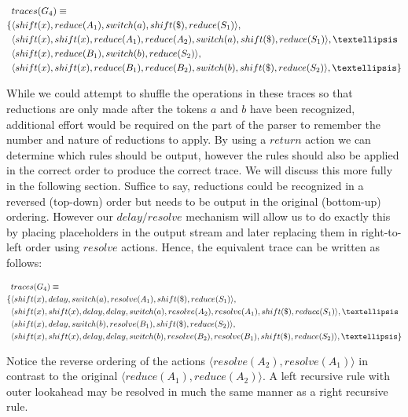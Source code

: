 \documentclass[11pt]{article}
\begin{document}
\parbox{.3\textwidth}{\begin{align*}
&traces(G_4) \equiv \\
\{ & \langle shift(x), reduce(A_1), switch(a), shift(\$), reduce(S_1) \rangle,\\
   & \langle shift(x), shift(x), reduce(A_1), reduce(A_2), switch(a), shift(\$), reduce(S_1) \rangle, \textellipsis \\
   & \langle shift(x), reduce(B_1), switch(b), reduce(S_2) \rangle,\\
   & \langle shift(x), shift(x), reduce(B_1), reduce(B_2), switch(b), shift(\$), reduce(S_2) \rangle, \textellipsis \}
\end{align*}}

While we could attempt to shuffle the operations in these traces so that reductions are only made after the tokens $a$ and $b$ have been recognized, 
additional effort would be required on the part of the parser to remember the number and nature of reductions to apply. 
By using a $return$ action we can determine which rules should be output, however the rules should also be applied in the correct order to produce the correct trace. 
We will discuss this more fully in the following section.
Suffice to say, reductions could be recognized in a reversed (top-down) order but needs to be output in the original (bottom-up) ordering.
However our $delay/resolve$ mechanism will allow us to do exactly this by placing placeholders in the output stream and later replacing them in right-to-left order using $resolve$ actions.
Hence, the equivalent trace can be written as follows:

\parbox{.3\textwidth}{\begin{align*}
&traces(G_4) \equiv \\
\{ & \langle shift(x), delay, switch(a), resolve(A_1), shift(\$), reduce(S_1) \rangle,\\
   & \langle shift(x), shift(x), delay, delay, switch(a), resolve(A_2), resolve(A_1), shift(\$), reduce(S_1) \rangle, \textellipsis \\
   & \langle shift(x), delay, switch(b), resolve(B_1), shift(\$), reduce(S_2) \rangle,\\
   & \langle shift(x), shift(x), delay, delay, switch(b), resolve(B_2), resolve(B_1), shift(\$), reduce(S_2) \rangle, \textellipsis \}
\end{align*}}

Notice the reverse ordering of the actions $\langle resolve(A_2), resolve(A_1) \rangle$ in contrast to the original $\langle reduce(A_1), reduce(A_2) \rangle$.
A left recursive rule with outer lookahead may be resolved in much the same manner as a right recursive rule.
\end{document}
